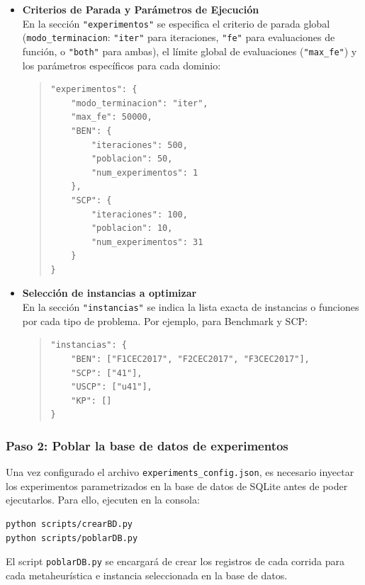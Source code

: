 \begin{itemize}
\item \textbf{Criterios de Parada y Parámetros de Ejecución}
\\
En la sección \texttt{"experimentos"} se especifica el criterio de parada global (\texttt{modo\_terminacion}: \texttt{"iter"} para iteraciones, \texttt{"fe"} para evaluaciones de función, o \texttt{"both"} para ambas), el límite global de evaluaciones (\texttt{"max\_fe"}) y los parámetros específicos para cada dominio:
\begin{quote}
\begin{verbatim}
"experimentos": {
    "modo_terminacion": "iter",
    "max_fe": 50000,
    "BEN": {
        "iteraciones": 500,
        "poblacion": 50,
        "num_experimentos": 1
    },
    "SCP": {
        "iteraciones": 100,
        "poblacion": 10,
        "num_experimentos": 31
    }
}
\end{verbatim}
\end{quote}

\item \textbf{Selección de instancias a optimizar}
\\
En la sección \texttt{"instancias"} se indica la lista exacta de instancias o funciones por cada tipo de problema. Por ejemplo, para Benchmark y SCP:
\begin{quote}
\begin{verbatim}
"instancias": {
    "BEN": ["F1CEC2017", "F2CEC2017", "F3CEC2017"],
    "SCP": ["41"],
    "USCP": ["u41"],
    "KP": []
}
\end{verbatim}
\end{quote}

\end{itemize}

\subsubsection{Paso 2: Poblar la base de datos de experimentos}

Una vez configurado el archivo \texttt{experiments\_config.json}, es necesario inyectar los experimentos parametrizados en la base de datos de SQLite antes de poder ejecutarlos. Para ello, ejecuten en la consola:
\begin{verbatim}
python scripts/crearBD.py
python scripts/poblarDB.py
\end{verbatim}
El script \texttt{poblarDB.py} se encargará de crear los registros de cada corrida para cada metaheurística e instancia seleccionada en la base de datos.

